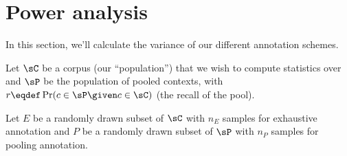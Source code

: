 \section{Power analysis}
\label{sec:power}

In this section, we'll calculate the variance of our different annotation schemes.

\newcommand{\xh}{\hat{x}}
\newcommand{\xb}{\bar{x}}
\newcommand{\yh}{\hat{y}}
\newcommand{\yb}{\bar{y}}
\newcommand{\rh}{\hat{r}}
\newcommand{\ph}{\hat{p}}

Let $\sC$ be a corpus (our ``population'') that we wish to compute statistics over
and $\sP$ be the population of pooled contexts, 
  with $r \eqdef \Pr(c \in \sP \given c \in \sC)$ (the recall of the pool).

Let $E$ be a randomly drawn subset of $\sC$ with $n_E$ samples for exhaustive annotation and
    $P$ be a randomly drawn subset of $\sP$ with $n_P$ samples for pooling annotation.


